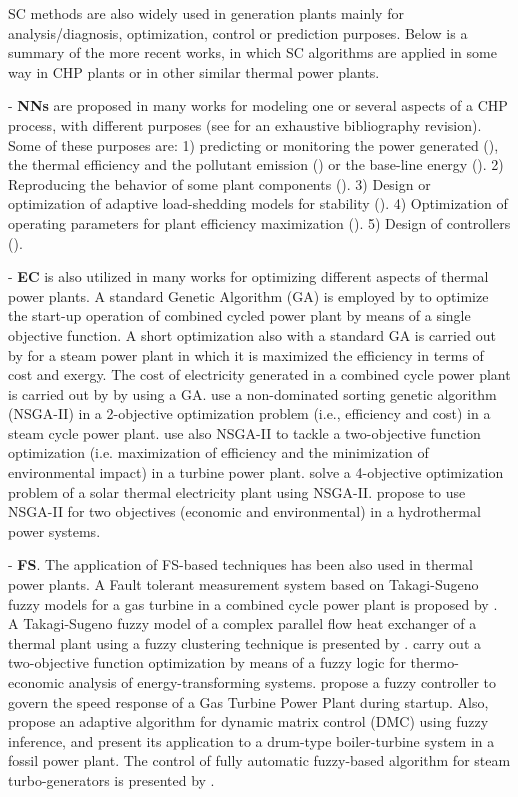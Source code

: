 SC methods are also widely used in generation plants mainly for analysis/diagnosis, optimization, control or prediction purposes. Below is a summary of the more recent works, in which SC algorithms are applied in some way in CHP plants or in other similar thermal power plants.

- \textbf{NNs} are proposed in many works for modeling one or several aspects of a CHP process, with different purposes  (see \cite{Rossi-2014} for an exhaustive bibliography revision). Some of these purposes are: 1) predicting or monitoring the power generated (\cite{De-2007,Smrekar-2010,Nikpey-2013,Sisworahardjo-2013}), the thermal efficiency and the pollutant emission (\cite{Flynn-2005,Pan-2007}) or the base-line energy (\cite{Rossi-2014}). 2) Reproducing the behavior of some plant components (\cite{Bekat-2012}). 3) Design or optimization of adaptive load-shedding models for stability (\cite{Kumar-2013}). 4) Optimization of operating parameters for plant efficiency maximization (\cite{Zomo-2011,Arslam-2011}). 5) Design of controllers (\cite{Wang-2008,Lee-2010}).

- \textbf{EC} is also utilized in many works for optimizing different aspects of thermal power plants. A standard Genetic Algorithm (GA) is employed by \cite{Bertini-12} to optimize the start-up operation of combined cycled power plant by means of a single objective function. A short optimization also with a standard GA is carried out by \cite{Ameri-09} for a steam power plant in which it is maximized the efficiency in terms of cost and exergy. The cost of electricity generated in a combined cycle power plant is carried out by \cite{Koch-2007} by using a GA. \cite{Haja-2012} use a non-dominated sorting genetic algorithm (NSGA-II) in a 2-objective optimization problem (i.e., efficiency and cost) in a steam cycle power plant. \cite{Ahmadi-2011} use also NSGA-II to tackle a two-objective function optimization (i.e. maximization of efficiency and the minimization of environmental impact) in a turbine power plant. \cite{Deb2012} solve a 4-objective optimization problem of a solar thermal electricity plant using NSGA-II. \cite{Basu-11} propose to use NSGA-II for two objectives (economic and environmental) in a hydrothermal power systems. 

- \textbf{FS}. The application of FS-based techniques has been also used in thermal power plants. A Fault tolerant measurement system based on Takagi-Sugeno fuzzy models for a gas turbine in a combined cycle power plant is proposed by \cite{Berrios-2011}. A Takagi-Sugeno fuzzy model of a complex parallel flow heat exchanger of a thermal plant using a fuzzy clustering technique is presented by \cite{Habi-2011}. \cite{Mazur-2009} carry out a two-objective function optimization by means of a fuzzy logic for thermo-economic analysis of energy-transforming systems. \cite{Rodriguez-Martinez-2011} propose a fuzzy controller to govern the speed response of a Gas Turbine Power Plant during startup. Also, \cite{Moon-2011} propose an adaptive algorithm for dynamic matrix control (DMC) using fuzzy inference, and present its application to a drum-type boiler-turbine system in a fossil power plant. The control of fully automatic fuzzy-based algorithm for steam turbo-generators is presented by \cite{Gunes-2010}.

